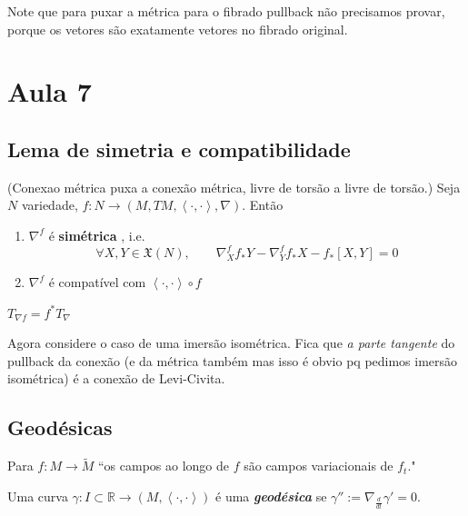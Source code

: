 \begin{remark}\leavevmode
Note que para puxar a métrica para o fibrado pullback não precisamos provar, porque os vetores são exatamente vetores no fibrado original.
\end{remark}

\section{Aula 7}

\subsection{Lema de simetria e compatibilidade}

\begin{lemma}\leavevmode
	(Conexao métrica puxa a conexão métrica, livre de torsão a livre de torsão.) Seja \(N\) variedade, \(f:N \to (M,TM,\left<\cdot,\cdot\right>,\nabla)\). Então
	\begin{enumerate}
	\item \(\nabla^f\) é \textbf{simétrica} , i.e.
		\[\forall X,Y \in \mathfrak{X}(N),\qquad \nabla^f_X f_*Y-\nabla^f_Y f_*X-f_*[X,Y]=0\]
	\item \(\nabla^f\) é compatível com \(\left<\cdot,\cdot\right> \circ f\)
	\end{enumerate}
	\begin{exercise}\leavevmode
		\(T_{\nabla f}=f^* T_\nabla\) 
	\end{exercise}
\end{lemma}

\begin{example}\leavevmode
Agora considere o caso de uma imersão isométrica. Fica que \textit{a parte tangente} do pullback da conexão (e da métrica também mas isso é obvio pq pedimos imersão isométrica) é a conexão de Levi-Civita.
\end{example}

\subsection{Geodésicas}


\begin{remark}\leavevmode
Para \(f:M \to \tilde{M}\) ``os campos ao longo de \(f\) são campos variacionais de \(f_t\)."
\end{remark}

\begin{defn}\leavevmode
Uma curva \(\gamma:I \subset \mathbb{R} \to (M, \left<\cdot,\cdot\right>)\) é uma \textit{\textbf{geodésica}} se \(\gamma'':=\nabla_{\frac{d}{dt}}\gamma'=0\).
\end{defn}

